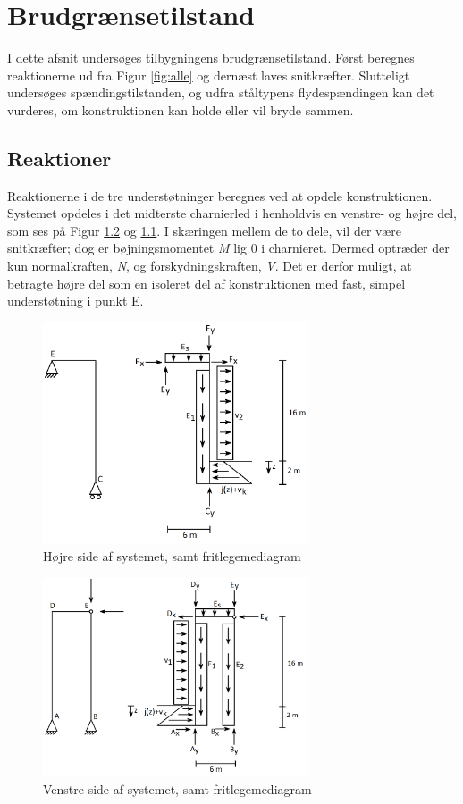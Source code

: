 \chapter{Brudgrænsetilstand}
I dette afsnit undersøges tilbygningens brudgrænsetilstand. Først beregnes reaktionerne ud fra Figur \ref{fig:alle} og dernæst laves snitkræfter. Slutteligt undersøges spændingstilstanden, og udfra ståltypens flydespændingen kan det vurderes, om konstruktionen kan holde eller vil bryde sammen.   

\section{Reaktioner}
Reaktionerne i de tre understøtninger beregnes ved at opdele konstruktionen. Systemet opdeles i det midterste charnierled i henholdvis en venstre- og højre del, som ses på Figur \ref{fig:opdelingv} og \ref{fig:opdelingh}. I skæringen mellem de to dele, vil der være snitkræfter; dog er bøjningsmomentet \textit{M} lig 0 i charnieret. Dermed optræder der kun normalkraften, \textit{N}, og forskydningskraften, \textit{V}. Det er derfor muligt, at betragte højre del som en isoleret del af konstruktionen med fast, simpel understøtning i punkt E.

\begin{figure}[H]
	\centering
	\includegraphics[width=0.7\textwidth]{billeder/hojre.png}
	\caption{Højre side af systemet, samt fritlegemediagram}
	\label{fig:opdelingh}
\end{figure}

\begin{figure}[H]
	\centering
	\includegraphics[width=0.7\textwidth]{billeder/venstre.png}
	\caption{Venstre side af systemet, samt fritlegemediagram}
	\label{fig:opdelingv}
\end{figure}

